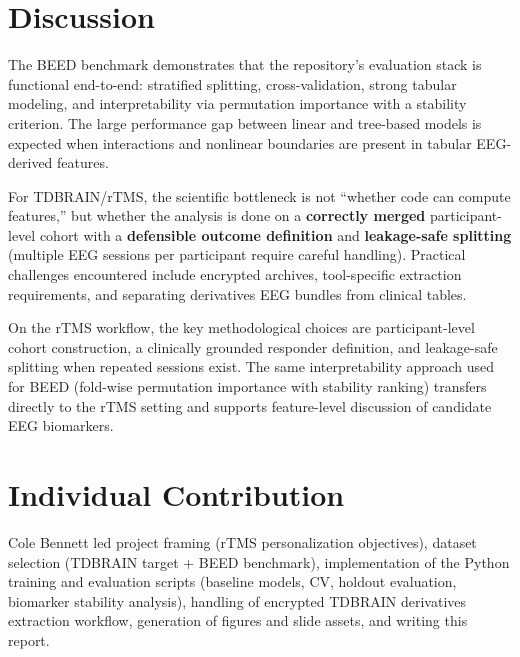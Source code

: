 \documentclass[11pt]{article}
\begin{document}
\section{Discussion}
The BEED benchmark demonstrates that the repository's evaluation stack is functional end-to-end: stratified splitting, cross-validation, strong tabular modeling, and interpretability via permutation importance with a stability criterion. The large performance gap between linear and tree-based models is expected when interactions and nonlinear boundaries are present in tabular EEG-derived features.

For TDBRAIN/rTMS, the scientific bottleneck is not ``whether code can compute features,'' but whether the analysis is done on a \textbf{correctly merged} participant-level cohort with a \textbf{defensible outcome definition} and \textbf{leakage-safe splitting} (multiple EEG sessions per participant require careful handling). Practical challenges encountered include encrypted archives, tool-specific extraction requirements, and separating derivatives EEG bundles from clinical tables.

On the rTMS workflow, the key methodological choices are participant-level cohort construction, a clinically grounded responder definition, and leakage-safe splitting when repeated sessions exist. The same interpretability approach used for BEED (fold-wise permutation importance with stability ranking) transfers directly to the rTMS setting and supports feature-level discussion of candidate EEG biomarkers.

\section{Individual Contribution}
Cole Bennett led project framing (rTMS personalization objectives), dataset selection (TDBRAIN target + BEED benchmark), implementation of the Python training and evaluation scripts (baseline models, CV, holdout evaluation, biomarker stability analysis), handling of encrypted TDBRAIN derivatives extraction workflow, generation of figures and slide assets, and writing this report.
\end{document}
